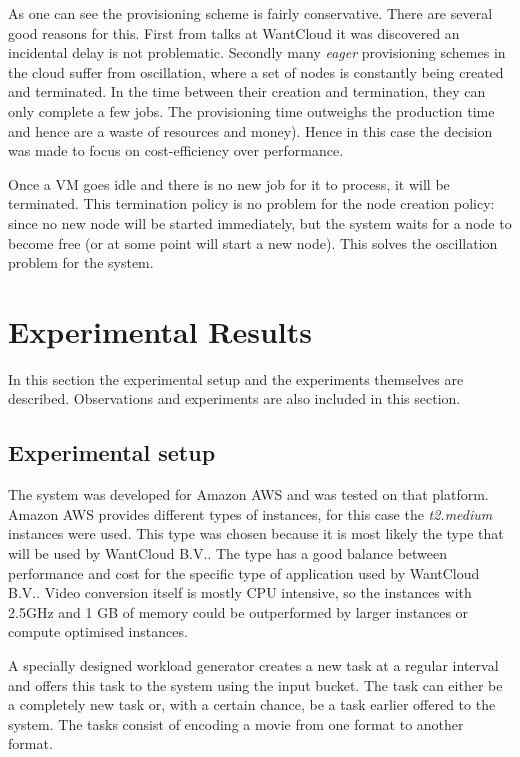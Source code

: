 \documentclass[a4paper]{IEEEtran}
\begin{document}
As one can see the provisioning scheme is fairly conservative.
There are several good reasons for this.
First from talks at WantCloud it was discovered an incidental delay is not problematic.
Secondly many \textit{eager} provisioning schemes in the cloud suffer from oscillation, where a set of nodes is constantly being created and terminated.
In the time between their creation and termination, they can only complete a few jobs.
The provisioning time outweighs the production time and hence are a waste of resources and money).
Hence in this case the decision was made to focus on cost-efficiency over performance.

Once a VM goes idle and there is no new job for it to process, it will be terminated.
This termination policy is no problem for the node creation policy: since no new node will be started immediately, but the system waits for a node to become free (or at some point will start a new node). 
This solves the oscillation problem for the system.

\section{Experimental Results}
In this section the experimental setup and the experiments themselves are described.
Observations and experiments are also included in this section.

\subsection{Experimental setup}

The system was developed for Amazon AWS and was tested on that platform.
Amazon AWS provides different types of instances, for this case the \emph{t2.medium} instances were used.
This type was chosen because it is most likely the type that will be used by WantCloud B.V..
The type has a good balance between performance and cost for the specific type of application used by WantCloud B.V..
Video conversion itself is mostly CPU intensive, so the instances with 2.5GHz and 1 GB of memory could be outperformed by larger instances or compute optimised instances.

A specially designed workload generator creates a new task at a regular interval and offers this task to the system using the input bucket.
The task can either be a completely new task or, with a certain chance, be a task earlier offered to the system.
The tasks consist of encoding a movie from one format to another format.
\end{document}
